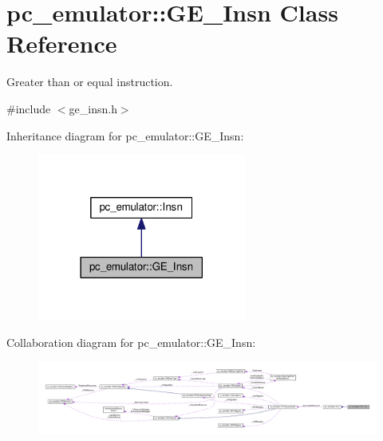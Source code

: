 \hypertarget{classpc__emulator_1_1GE__Insn}{}\section{pc\+\_\+emulator\+:\+:G\+E\+\_\+\+Insn Class Reference}
\label{classpc__emulator_1_1GE__Insn}


Greater than or equal instruction.  




{\ttfamily \#include $<$ge\+\_\+insn.\+h$>$}



Inheritance diagram for pc\+\_\+emulator\+:\+:G\+E\+\_\+\+Insn\+:\nopagebreak
\begin{figure}[H]
\begin{center}
\leavevmode
\includegraphics[width=194pt]{classpc__emulator_1_1GE__Insn__inherit__graph}
\end{center}
\end{figure}


Collaboration diagram for pc\+\_\+emulator\+:\+:G\+E\+\_\+\+Insn\+:\nopagebreak
\begin{figure}[H]
\begin{center}
\leavevmode
\includegraphics[width=350pt]{classpc__emulator_1_1GE__Insn__coll__graph}
\end{center}
\end{figure}
